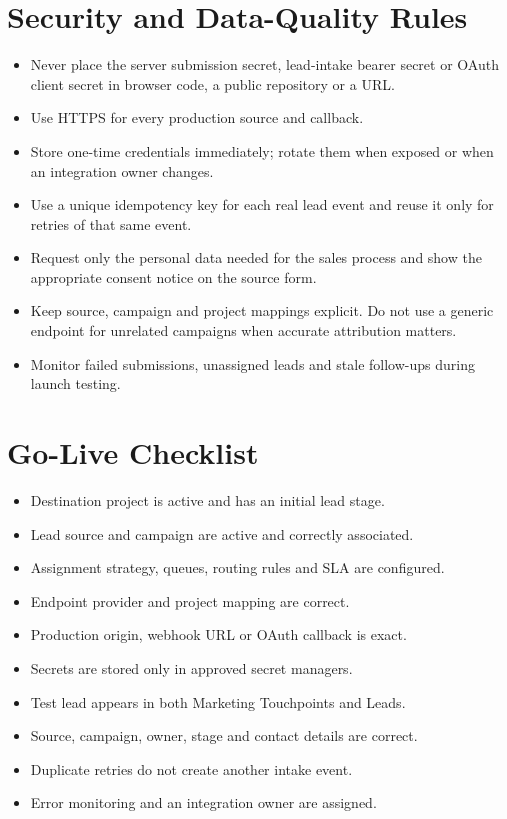 \documentclass[11pt,a4paper]{article}
\begin{document}
\section{Security and Data-Quality Rules}

\begin{itemize}
  \item Never place the server submission secret, lead-intake bearer secret or OAuth client secret in browser code, a public repository or a URL.
  \item Use HTTPS for every production source and callback.
  \item Store one-time credentials immediately; rotate them when exposed or when an integration owner changes.
  \item Use a unique idempotency key for each real lead event and reuse it only for retries of that same event.
  \item Request only the personal data needed for the sales process and show the appropriate consent notice on the source form.
  \item Keep source, campaign and project mappings explicit. Do not use a generic endpoint for unrelated campaigns when accurate attribution matters.
  \item Monitor failed submissions, unassigned leads and stale follow-ups during launch testing.
\end{itemize}

\section{Go-Live Checklist}

\begin{itemize}[label=$\square$]
  \item Destination project is active and has an initial lead stage.
  \item Lead source and campaign are active and correctly associated.
  \item Assignment strategy, queues, routing rules and SLA are configured.
  \item Endpoint provider and project mapping are correct.
  \item Production origin, webhook URL or OAuth callback is exact.
  \item Secrets are stored only in approved secret managers.
  \item Test lead appears in both Marketing Touchpoints and Leads.
  \item Source, campaign, owner, stage and contact details are correct.
  \item Duplicate retries do not create another intake event.
  \item Error monitoring and an integration owner are assigned.
\end{itemize}
\end{document}
